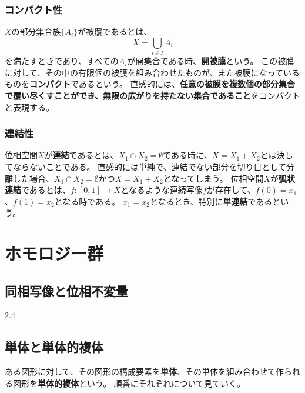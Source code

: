 \documentclass[a4paper]{jsreport}
\begin{document}
            \subsection*{コンパクト性}
                $X$の部分集合族$\{A_i\}$が被覆であるとは、
                \begin{equation}
                    X = \bigcup_{i \in I} A_i
                \end{equation}
                を満たすときであり、すべての$A_i$が開集合である時、\textbf{開被膜}という。
                この被膜に対して、その中の有限個の被膜を組み合わせたものが、また被膜になっているものを\textbf{コンパクト}であるという。
                直感的には、\textbf{任意の被膜を複数個の部分集合で覆い尽くすことができ、無限の広がりを持たない集合であること}をコンパクトと表現する。

            \subsection*{連結性}
                位相空間$X$が\textbf{連結}であるとは、$X_1 \cap X_2 = \emptyset$である時に、$X = X_1 + X_2$とは決してならないことである。
                直感的には単純で、連結でない部分を切り目として分離した場合、$X_1 \cap X_2 = \emptyset$かつ$X = X_1 + X_2$となってしまう。
                位相空間$X$が\textbf{弧状連結}であるとは、$f:[0,1] \to X$となるような連続写像$f$が存在して、$f(0) = x_1$、$f(1) = x_2$となる時である。
                $x_1 = x_2$となるとき、特別に\textbf{単連結}であるという。

    \chapter{ホモロジー群}
        \section{同相写像と位相不変量}
        2.4
        \section{単体と単体的複体}
            ある図形に対して、その図形の構成要素を\textbf{単体}、その単体を組み合わせて作られる図形を\textbf{単体的複体}という。
            順番にそれぞれについて見ていく。
\end{document}
